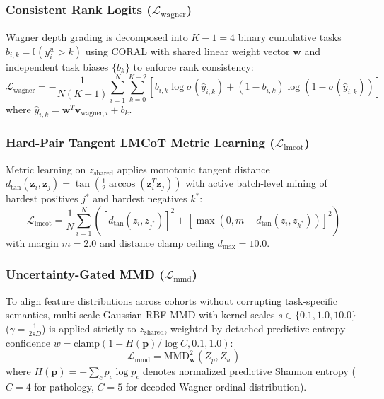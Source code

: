 \documentclass[journal]{IEEEtran}
\begin{document}
\subsubsection{Consistent Rank Logits ($\mathcal{L}_{\text{wagner}}$)}
Wagner depth grading is decomposed into $K-1=4$ binary cumulative tasks $b_{i, k} = \mathbb{I}(y_i^w > k)$ using CORAL \cite{cao2020rank} with shared linear weight vector $\mathbf{w}$ and independent task biases $\{b_k\}$ to enforce rank consistency:
\begin{equation}
    \mathcal{L}_{\text{wagner}} = -\frac{1}{N (K-1)} \sum_{i=1}^N \sum_{k=0}^{K-2} \left[ b_{i, k} \log \sigma(\hat{y}_{i, k}) + (1 - b_{i, k}) \log \left(1 - \sigma(\hat{y}_{i, k})\right) \right]
\end{equation}
where $\hat{y}_{i, k} = \mathbf{w}^T \mathbf{v}_{\text{wagner}, i} + b_k$.

\subsubsection{Hard-Pair Tangent LMCoT Metric Learning ($\mathcal{L}_{\text{lmcot}}$)}
\label{sec:method_metric}
Metric learning on $z_{\text{shared}}$ applies monotonic tangent distance $d_{\tan}(\mathbf{z}_i, \mathbf{z}_j) = \tan\left(\frac{1}{2} \arccos(\mathbf{z}_i^T \mathbf{z}_j)\right)$ with active batch-level mining of hardest positives $j^*$ and hardest negatives $k^*$:
\begin{equation}
    \mathcal{L}_{\text{lmcot}} = \frac{1}{N} \sum_{i=1}^N \left( \left[d_{\tan}(z_i, z_{j^*})\right]^2 + \left[\max\left(0, m - d_{\tan}(z_i, z_{k^*})\right)\right]^2 \right)
\end{equation}
with margin $m = 2.0$ and distance clamp ceiling $d_{\max} = 10.0$.

\subsubsection{Uncertainty-Gated MMD ($\mathcal{L}_{\text{mmd}}$)}
To align feature distributions across cohorts without corrupting task-specific semantics, multi-scale Gaussian RBF MMD \cite{gretton2012kernel} with kernel scales $s \in \{0.1, 1.0, 10.0\}$ ($\gamma = \frac{1}{2 s D}$) is applied strictly to $z_{\text{shared}}$, weighted by detached predictive entropy confidence $w = \text{clamp}(1 - H(\mathbf{p})/\log C, 0.1, 1.0)$:
\begin{equation}
    \mathcal{L}_{\text{mmd}} = \text{MMD}^2_{\mathbf{w}}\left(Z_p, Z_w\right)
\end{equation}
where $H(\mathbf{p}) = -\sum_{c} p_c \log p_c$ denotes normalized predictive Shannon entropy ($C=4$ for pathology, $C=5$ for decoded Wagner ordinal distribution).
\end{document}
